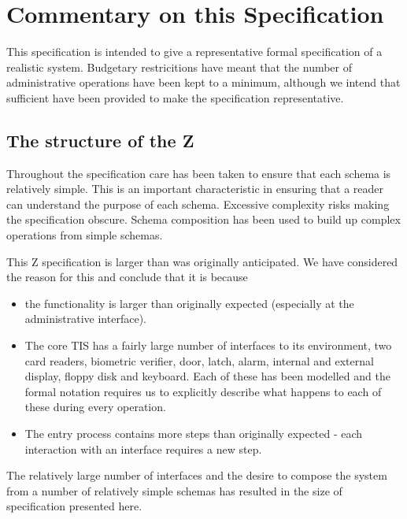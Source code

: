 \chapter{Commentary on this Specification}
\label{sec:Summary}

This specification is intended to give a representative formal
specification of a realistic system. Budgetary restricitions have
meant that the number of administrative operations have been kept to a
minimum, although we intend that sufficient have been provided to make
the specification representative.

\section{The structure of the Z}
Throughout the specification care has been taken to ensure that each
schema is relatively simple. This is an important characteristic in
ensuring that a reader can understand the purpose of each
schema. Excessive complexity risks making the specification obscure. 
Schema composition has been used to build up complex
operations from simple schemas.

This Z specification is larger than was originally anticipated. We
have considered the reason for this and conclude that it is because
\begin{itemize}
\item
the functionality is larger than originally expected (especially at
the administrative interface).
\item
The core TIS has a fairly large number of interfaces to its
environment, two card readers, biometric verifier, door, latch, alarm,
internal and external display, floppy disk and keyboard. Each of these
has been modelled and the formal notation requires us to explicitly
describe what happens to each of these during every operation.
\item
The entry process contains more steps than originally expected - each
interaction with an interface requires a new step.
\end{itemize}

The relatively large number of interfaces and the desire to compose
the system from a number of relatively 
simple schemas has resulted in the size of specification presented here.

